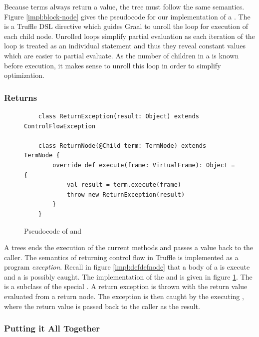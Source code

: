 Because terms always return a value, the  tree must follow the same semantics.
Figure \ref{impl:block-node} gives the pseudocode for our implementation of a .
The  is a Truffle DSL directive which guides Graal to unroll\cite{loop-unrolling} the loop for execution of each child node.
Unrolled loops simplify partial evaluation as each iteration of the loop is treated as an individual statement and thus they reveal constant values which are easier to partial evaluate.
As the number of children in a  is known before execution, it makes sense to unroll this loop in order to simplify optimization.

\subsubsection*{Returns}

\begin{figure}[!htb]
	\begin{verbatim}
	class ReturnException(result: Object) extends ControlFlowException
	
	class ReturnNode(@Child term: TermNode) extends TermNode {
		override def execute(frame: VirtualFrame): Object = { 
			val result = term.execute(frame)
			throw new ReturnException(result)
		}
	}
	\end{verbatim}
	\caption{Pseudocode of  and }
	\label{impl:return}
\end{figure}

A  trees ends the execution of the current methods and passes a value back to the caller.
The semantics of returning control flow in Truffle is implemented as a program \textit{exception}.
Recall in figure \ref{impl:defdefnode} that a body of a  is execute and a  is possibly caught.
The implementation of the  and  is given in figure \ref{impl:return}.
The  is a subclass of the special . 
A return exception is thrown with the return value evaluated from a return node.
The exception is then caught by the executing , where the return value is passed back to the caller as the result. 

\subsubsection*{Putting it All Together}

